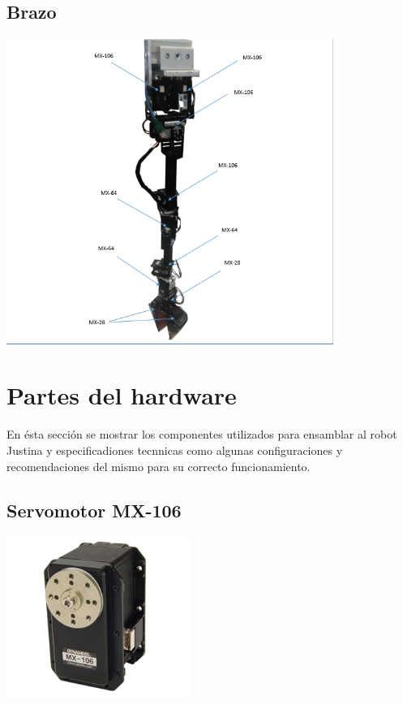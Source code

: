 \documentclass[a4paper]{book}
\begin{document}
\subsection{Brazo}
\begin{center}
\includegraphics[width=0.8\textwidth]{Figures/Hardware/Diagramas/Brazo.png}
\label{fig:Hardware:Diagramas:Imagen:Brazo}
\end{center}

 \pagebreak

\section{Partes del hardware}
En ésta sección se mostrar los componentes utilizados para ensamblar al robot Justina y especificadiones tecnnicas como algunas configuraciones y recomendaciones del mismo para su correcto funcionamiento.

\pagebreak

\subsection{Servomotor MX-106}

\begin{center}
\includegraphics[width=0.45\textwidth]{Figures/Hardware/Partes/MX-106.png}
\label{fig:Hardware:Partes:MX-106}
\end{center}
\end{document}
